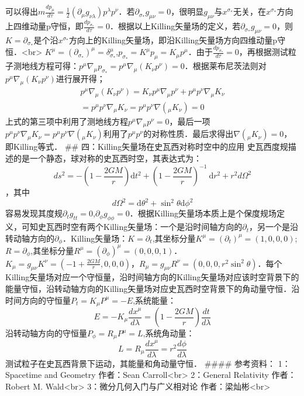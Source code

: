 可以得出$m\frac{d p_{\mu}}{d \tau}=\frac{1}{2}\left(\partial_{\mu} g_{\nu \lambda}\right) p^{\lambda} p^{\nu}$．若$\partial_{\sigma_{*}} g_{\mu \nu}=0$，很明显$g_{\mu \nu}$与$x^{\sigma_{*}}$无关，在$x^{\sigma_{*}}$方向上四维动量p守恒，即$\frac{d p_{\sigma_{*}}}{d \tau}=0$．根据以上Killing矢量场的定义，若$\partial_{\sigma_{*}} g_{\mu \nu}=0$，则$K=\partial_{\sigma_{*}}$是个沿$x^{\sigma_{*}}$方向上的Killing矢量场，即沿Killing矢量场方向四维动量p守恒．<br>
$K^{\mu}=(\partial_{\sigma_{*}})^{\mu}=\delta_{\sigma_{*}}^{\mu}$,$p_{\sigma_{*}}=K^{\mu}p_{\mu}=K_{\mu}p^{\mu}$．由于$\frac{d p_{\sigma_{*}}}{d \tau}=0$，再根据测试粒子测地线方程可得：$p^{\mu} \nabla_{\mu} p_{\sigma_{*}}=p^{\mu} \nabla_{\mu}(K_{\nu}p^{\nu}) =0$．根据莱布尼茨法则对$p^{\mu} \nabla_{\mu}(K_{\nu}p^{\nu})$进行展开得；
$$\begin{aligned}
p^{\mu} \nabla_{\mu}(K_{\nu}p^{\nu})=K_{\nu}p^{\mu} \nabla_{\mu}p^{\nu}+p^{\mu} p^{\nu}\nabla_{\mu}K_{\nu}\\
=p^{\mu} p^{\nu}\nabla_{\mu}K_{\nu}=p^{\mu} p^{\nu}\nabla(_{\mu}K_{\nu})=0
\end{aligned}$$
上式的第三项中利用了测地线方程$p^{\mu} \nabla_{\mu}p^{\nu}=0$，最后一项$p^{\mu} p^{\nu}\nabla_{\mu}K_{\nu}=p^{\mu} p^{\nu}\nabla(_{\mu}K_{\nu})$利用了$p^{\mu} p^{\nu}$的对称性质．最后求得出$\nabla(_{\mu}K_{\nu})=0$，即Killing等式．
## 四：Killing矢量场在史瓦西对称时空中的应用
史瓦西度规描述的是一个静态，球对称的史瓦西时空，其表达式为：
$$d s^{2}=-\left(1-\frac{2 G M}{r}\right) \mathrm{d} t^{2}+\left(1-\frac{2 G M}{r}\right)^{-1} \mathrm{~d} r^{2}+r^{2} d \Omega^{2}$$，其中$$d \Omega^{2}=\mathrm{d} \theta^{2}+\sin ^{2} \theta \mathrm{d} \phi^{2}$$
容易发现其度规$\partial_{t} g_{tt}=0$,$\partial_{\phi} g_{\phi\phi}=0$．根据Killing矢量场本质上是个保度规场定义，可知史瓦西时空有两个Killing矢量场：一个是沿时间轴方向的$\partial_{t}$，另一个是沿转动轴方向的$\partial_{\phi}$．Killing矢量场：$K=\partial_{t}$,其坐标分量$K^{\mu}=\left(\partial_{t}\right)^{\mu}=(1,0,0,0)$;$R=\partial_{\phi}$,其坐标分量$R^{\mu}=\left(\partial_{\phi}\right)^{\mu}=(0,0,0,1)$．$K_{\mu}=g_{\mu \nu}K^{\nu}=(-1+\frac{2 G M}{r},0,0,0)$，$R_{\mu}=g_{\mu \nu}R^{\nu}=(0,0,0,r^{2}\sin ^{2} \theta )$．每个Killing矢量场对应一个守恒量，沿时间轴方向的Killing矢量场对应该时空背景下的能量守恒，沿转动轴方向的Killing矢量场对应史瓦西时空背景下的角动量守恒．沿时间方向的守恒量$P_{t}=K_{\mu}P^{\mu}=-E$,系统能量：$$E=-K_{\mu} \frac{d x^{\mu}}{d \lambda}=\left(1-\frac{2 G M}{r}\right) \frac{d t}{d \lambda}$$
沿转动轴方向的守恒量$P_{\phi}=R_{\mu}P^{\mu}=L$,系统角动量：$$L=R_{\mu} \frac{d x^{\mu}}{d \lambda}=r^{2} \frac{d \phi}{d \lambda}$$
测试粒子在史瓦西背景下运动，其能量和角动量守恒．
#### 参考资料：
1：Spacetime and Geometry 作者：Sean Carroll<br>
2：General Relativity   作者：Robert M. Wald<br>
3：微分几何入门与广义相对论  作者：梁灿彬<br>